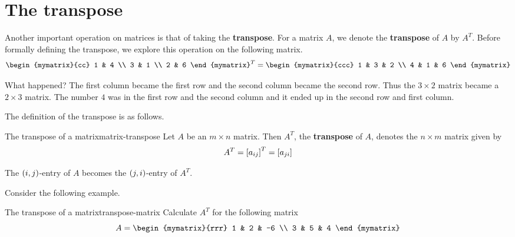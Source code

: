 \section{The transpose}

Another important operation on matrices is that of taking the \textbf{transpose}. For a matrix $A$, we denote the
\textbf{transpose} of $A$ by $A^T$. Before formally defining the transpose, we explore this
operation on the following matrix.
\begin{equation*}
\begin{mymatrix}{cc}
1 & 4 \\
3 & 1 \\
2 & 6
\end{mymatrix} ^{T}=\allowbreak \begin{mymatrix}{ccc}
1 & 3 & 2 \\
4 & 1 & 6
\end{mymatrix}
\end{equation*}

What happened? The first column became the first row and the second column
became the second row. Thus the $3\times 2$ matrix became a $2\times 3$
matrix. The number $4$ was in the first row and the second column and it
ended up in the second row and first column. 

The definition of the transpose is as follows.

\begin{definition}{The transpose of a matrix}{matrix-transpose}
Let $A$ be an $m\times n$ matrix. Then $A^{T}$, the \textbf{transpose} of $A$,  denotes the $n\times m$
matrix given by 
\begin{equation*}
A^{T} = \left[a _{ij}\right] ^{T}= \left[a_{ji} \right]
\end{equation*}
\end{definition}

The $\left(i, j  \right)$-entry of $A$ becomes the 
$\left(j,i \right)$-entry of $A^T$. 

Consider the following example.

\begin{example}{The transpose of a matrix}{transpose-matrix}
Calculate $A^T$ for the following matrix
\begin{equation*}
A = \begin{mymatrix}{rrr}
1 & 2 & -6 \\
3 & 5 & 4
\end{mymatrix}
\end{equation*}
\end{example}


